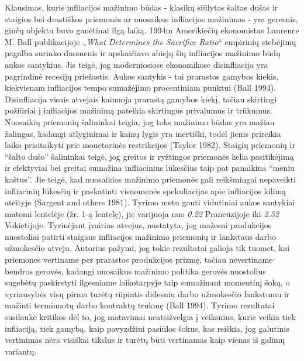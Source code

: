 \documentclass[
]{article}
\begin{document}
Klausimas, kuris infliacijos mažinimo būdas - klasikų siūlytas šaltas
dušas ir staigios bei drastiškos priemonės ar nuosaikus infliacijos
mažinimas - yra geresnis, ginčų objektu buvo ganėtinai ilgą laiką. 1994m
Amerikiečių ekonomistas Laurence M. Ball publikacijoje „\emph{What
Determines the Sacrifice Ratio}`` empirinių stebėjimų pagalba surinko
duomenis ir apskaičiavo abiejų šių infliacijos mažinimo būdų aukos
santykius. Jis teigė, jog moderniosiose ekonomikose disinfliacija yra
pagrindinė recesijų priežastis. Aukos santykis - tai prarastos gamybos
kiekis, kiekvienam infliacijos tempo sumažėjimo procentiniam punktui
(Ball 1994).\\
Disinfliacija visais atvejais kainuoja prarastą gamybos kiekį, tačiau
skirtingi požiūriai į infliacijos mažinimą pateikia skirtingus
privalumus ir trūkumus. Nuosaikių priemonių šalininkai teigia, jog toks
mažinimo būdas yra mažiau žalingas, kadangi atlyginimai ir kainų lygis
yra inertiški, todėl jiems prireikia laiko prisitaikyti prie monetarinės
restrikcijos (Taylor 1982). Staigių priemonių ir ``šalto dušo''
šalininkai teigė, jog greitos ir ryžtingos priemonės kelia pasitikėjimą
ir efektyviai bei greitai sumažina infliacinius lūkesčius taip pat
panaikina ``meniu kaštus''. Jie teigė, kad nuosaikios mažinimo priemonės
gali reikšmingai nepaveikti infliacinių lūkesčių ir paskatinti
visuomenės spekuliacijas apie infliacijos kilimą ateityje (Sargent and
others 1981). Tyrimo metu gauti vidutiniai aukos santykiai matomi
lentelėje (žr. 1-ą lentelę), jie varijuoja nuo \emph{0.22} Prancūzijoje
iki \emph{2.52} Vokietijoje. Tyrinėjant įvairius atvejus, nustatyta, jog
mažesni produkcijos nuostoliai patirti staigaus infliacijos mažinimo
priemonių ir lankstaus darbo užmokesčio atveju. Autorius pažymi, jog
tokie rezultatai galioja tik tuomet, kai priemones vertiname per
prarastos produkcijos prizmę, tačiau nevertiname bendros gerovės,
kadangi nuosaikus mažinimo politika gerovės nuostolius sugebėtų
paskirstyti ilgesniame laikotarpyje taip sumažinant momentinį šoką, o
vyriausybės visų pirma turėtų rūpintis didesniu darbo užmokesčio
lankstumu ir mažinti terminuotų darbo kontraktų trukmę (Ball 1994).
Tyrimo rezultatai susilaukė kritikos dėl to, jog matavimai neatsižvelgia
į veiksnius, kurie veikia tiek infliaciją, tiek gamybą, kaip pavyzdžiui
pasiūlos šokus, kas reiškia, jog galutinis vertinimas nėra visiškai
tikslus ir turėtų būti vertinamas kaip vienas iš galimų variantų.
\end{document}

